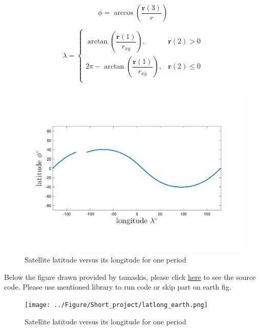     $$
    \phi = \arccos(\dfrac{\boldsymbol r(3)}{r})
    $$

    $$
    \lambda = 
\begin{cases}
    \arctan(\dfrac{\boldsymbol r(1)}{r_{xy}}),& \boldsymbol r(2) > 0\\
    2\pi-\arctan(\dfrac{\boldsymbol r(1)}{r_{xy}}),& \boldsymbol r(2) \leq 0\\
\end{cases}
    $$

    \begin{figure}[H]
        \caption{Satellite latitude versus its longitude for one period}
        \centering
        \includegraphics[width=16cm]{../Figure/Short_project/latlong.png}
    \end{figure}

    Below the figure drawn provided by tamaskis, please click \href{https://github.com/tamaskis/ground_track-MATLAB}{here} to see the source code. Please use mentioned library to run code or skip part on earth fig.

    \begin{figure}[H]
        \caption{Satellite latitude versus its longitude for one period}
        \centering
        \texttt{[image: ../Figure/Short\_project/latlong\_earth.png]}
    \end{figure}

